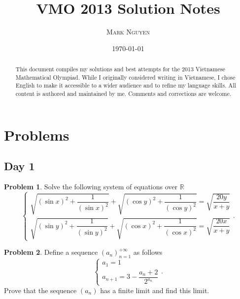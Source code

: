 \documentclass[11pt]{article}
\title{\textbf{\Huge VMO 2013 Solution Notes}}
\author{\LARGE \textsc{Mark Nguyen}}
\date{\sffamily\today}
\theoremstyle{definition}
\newtheorem{exercise}{Problem}
\newcommand{\boom}{\vspace{0.25cm}}
\begin{document}
\maketitle

\begin{abstract}
    This document compiles my solutions and best attempts for the 2013 Vietnamese Mathematical Olympiad. While I originally considered writing in Vietnamese, I chose English to make it accessible to a wider audience and to refine my language skills. All content is authored and maintained by me. Comments and corrections are welcome.
\end{abstract}

\tableofcontents

\newpage

\section{Problems}

    \subsection*{Day 1}

        \begin{exercise}
            Solve the following system of equations over \(\mathbb{R}\)
            \[\begin{cases}
                \sqrt{\left(\sin x\right)^2 + \dfrac{1}{\left(\sin x\right)^2}} + \sqrt{\left(\cos y\right)^2 + \dfrac{1}{\left(\cos y\right)^2}} = \sqrt{\dfrac{20y}{x + y}} \\
                \sqrt{\left(\sin y\right)^2 + \dfrac{1}{\left(\sin y\right)^2}} + \sqrt{\left(\cos x\right)^2 + \dfrac{1}{\left(\cos x\right)^2}} = \sqrt{\dfrac{20x}{x + y}}
            \end{cases}.\]
        \end{exercise}
    
        \boom
    
        \begin{exercise}
            Define a sequence \((a_n)_{n=1}^{+\infty}\) as follows
            \[\begin{cases}
                a_1 = 1 \\
                a_{n+1} = 3 - \dfrac{a_n + 2}{2^{a_n}} 
            \end{cases}.\]
            Prove that the sequence \((a_n)\) has a finite limit and find this limit.
        \end{exercise}
    
\end{document}
